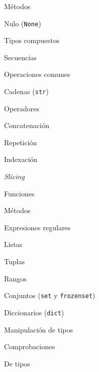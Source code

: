 \begin{longenum}
\begin{longenum}
\begin{longenum}
\begin{longenum}
                \item Métodos
            \end{longenum}
            \item Nulo (\texttt{None})
        \end{longenum}
        \item Tipos compuestos
        \begin{longenum}
            \item Secuencias
            \begin{longenum}
                \item Operaciones comunes
                \item Cadenas (\texttt{str})
                \begin{longenum}
                    \item Operadores
                    \begin{longenum}
                        \item Concatenación
                        \item Repetición
                        \item Indexación
                        \item \textit{Slicing}
                    \end{longenum}
                    \item Funciones
                    \item Métodos
                    \item Expresiones regulares
                \end{longenum}
                \item Listas
                \item Tuplas
                \item Rangos
            \end{longenum}
            \item Conjuntos (\texttt{set} y \texttt{frozenset})
            \item Diccionarios (\texttt{dict})
        \end{longenum}
        \item Manipulación de tipos
        \begin{longenum}
            \item Comprobaciones
            \begin{longenum}
                \item De tipos
                \begin{longenum}

\end{longenum}
\end{longenum}
\end{longenum}
\end{longenum}
\end{longenum}
